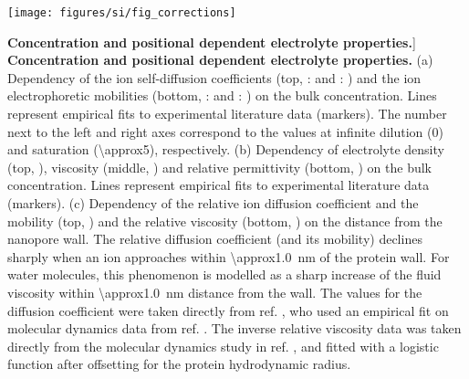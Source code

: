 
\begin{figure*}[!b]

\centering

\texttt{[image: figures/si/fig\_corrections]}

\caption
[\textbf{Concentration and positional dependent electrolyte properties.}]
{
\textbf{Concentration and positional dependent electrolyte properties.}
(a)
Dependency of the ion self-diffusion coefficients (top, :  and :
) and the ion electrophoretic mobilities (bottom, :
 and : ) on the bulk 
concentration. Lines represent empirical fits to experimental literature data (markers). The number next to
the left and right axes correspond to the values at infinite dilution (\SI{0}{\Molar}) and saturation
(\SI{\approx5}{\Molar}),  respectively.
(b)
Dependency of electrolyte density (top, ), viscosity (middle,
) and relative permittivity (bottom, ) on the
bulk  concentration. Lines represent empirical fits to experimental literature data (markers).
(c)
Dependency of the relative ion diffusion coefficient and the mobility (top, ) and
the relative viscosity (bottom, ) on the distance from the nanopore wall. The
relative diffusion coefficient (and its mobility) declines sharply when an ion approaches within
\SI{\approx1.0}{\nm} of the protein wall. For water molecules, this phenomenon is modelled as a sharp increase
of the fluid viscosity within \SI{\approx1.0}{\nm} distance from the wall. The values for the diffusion
coefficient were taken directly from ref. , who used an empirical fit on molecular
dynamics data from ref. . The inverse relative viscosity data was taken directly from
the molecular dynamics study in ref. , and fitted with a logistic function after
offsetting for the protein hydrodynamic radius.
}

\label{fig:corrections}

\end{figure*}
